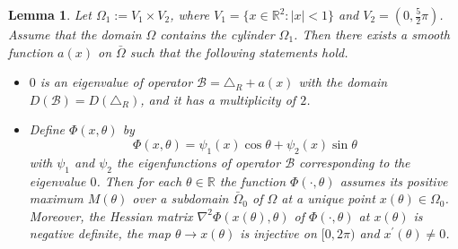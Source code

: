 \documentclass{elsarticle}
\newtheorem{lemma}{Lemma}[section]
\begin{document}
\begin{lemma} \label{eigenvalue:multiple}
Let $\Omega_1:=V_1\times V_2$, where $V_1=\{x\in\mathbb{R}^2: |x|<1\}$ and $V_2 = (0, \frac{5}{2}\pi)$. Assume that the domain $\Omega$ contains the cylinder $\Omega_1$.
Then there exists a smooth function $a(x)$ on $\bar{\Omega}$ such that the following statements hold.
\begin{itemize}
\item[{\rm(1)}] $0$ is an eigenvalue of operator $\mathcal{B}= \triangle_R + a(x)$ with the domain $D(\mathcal{B}) = D(\triangle_R)$, and it has a multiplicity of $2$.
\item[{\rm(2)}] Define $\Phi(x, \theta)$ by
\begin{equation}
\Phi(x, \theta)=\psi_1(x)\cos\theta + \psi_2(x)\sin\theta
\end{equation}
with $\psi_1$ and $\psi_2$ the eigenfunctions of operator $\mathcal{B}$ corresponding to the eigenvalue $0$. 
Then for each $\theta\in\mathbb{R}$ the function $\Phi(\cdot, \theta)$ assumes its positive maximum $M(\theta)$ over a subdomain $\bar{\Omega}_0$ of $\Omega$ at a unique point $x(\theta) \in \Omega_0$. Moreover, the Hessian matrix $\nabla^2\Phi(x(\theta), \theta)$ of $\Phi(\cdot, \theta)$ at $x(\theta)$ is negative definite, the map $\theta\rightarrow x(\theta)$ is injective on $[0, 2\pi)$ and $x^{\prime}(\theta)\neq 0$.
\end{itemize}
\end{lemma}
\end{document}
